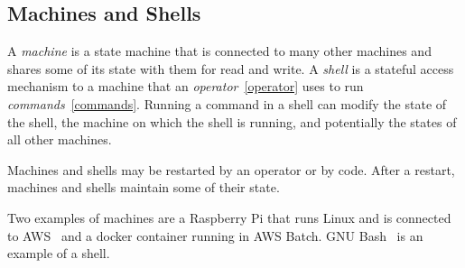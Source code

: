 \subsection{Machines and Shells}
\label{machine}

A \emph{machine} is a state machine that is connected to many other machines and shares some of its state with them for read and write. A \emph{shell} is a stateful access mechanism to a machine that an \emph{operator}~\ref{operator} uses to run \emph{commands}~\ref{commands}. Running a command in a shell can modify the state of the shell, the machine on which the shell is running, and potentially the states of all other machines. 

Machines and shells may be restarted by an operator or by code. After a restart, machines and shells maintain some of their state. 

Two examples of machines are a Raspberry Pi that runs Linux and is connected to AWS~ and a docker container running in AWS Batch. GNU Bash~ is an example of a shell.